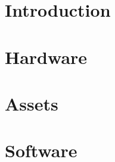 \documentclass[8pt]{book}
\begin{document}
         

    \renewcommand{\rmdefault}{cmss} 
    \renewcommand{\familydefault}{\sfdefault}
    

    
    
    \cleardoublepage %
  

    \cleardoublepage %

    \setcounter{secnumdepth}{3} %
    
    
    
    
    \tableofcontents
    
    \pagebreak

	\chapter{Introduction}
      
    
  
    \chapter{Hardware}
      
      
    \chapter{Assets}
      
      
    \chapter{Software}
       
       
       
       
       

  
    \cleartoleftpage
    \thispagestyle{plain} \blankpage
    \thispagestyle{plain} \blankpage
    \thispagestyle{plain} \blankpage
\end{document}
